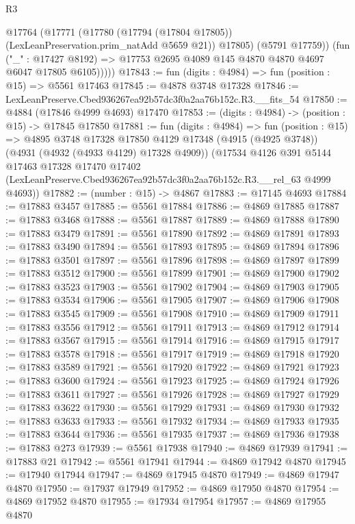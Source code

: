 \begin{lexlean}{R3}
\begin{coremodule}
            @17764
              (@17771
                (@17780 (@17794 (@17804 @17805)) (LexLeanPreservation.prim_natAdd @5659 @21))
                @17805)
              (@5791 @17759))
            (fun ("_" : @17427 @8192) =>
            @17753 @2695 @4089 @145 @4870 @4870 @4697 @6047 @17805 @6105)))))
@17843 := fun (digits : @4984) => fun (position : @15) => @5561 @17463
@17845 := @4878 @3748 @17328
@17846 := LexLeanPreserve.Cbed936267ea92b57dc3f0a2aa76b152c.R3.__fits_54
@17850 := @4884 (@17846 @4999 @4693) @17470
@17853 := (digits : @4984) -> (position : @15) -> @17845 @17850
@17881 := fun (digits : @4984) =>
  fun (position : @15) =>
  @4895
    @3748
    @17328
    @17850
    @4129
    @17348
    (@4915 (@4925 @3748))
    (@4931 (@4932 (@4933 @4129) @17328 @4909))
    (@17534
      @4126
      @391
      @5144
      @17463
      @17328
      @17470
      @17402
      (LexLeanPreserve.Cbed936267ea92b57dc3f0a2aa76b152c.R3.__rel_63 @4999 @4693))
@17882 := (number : @15) -> @4867
@17883 := @17145 @4693
@17884 := @17883 @3457
@17885 := @5561 @17884
@17886 := @4869 @17885
@17887 := @17883 @3468
@17888 := @5561 @17887
@17889 := @4869 @17888
@17890 := @17883 @3479
@17891 := @5561 @17890
@17892 := @4869 @17891
@17893 := @17883 @3490
@17894 := @5561 @17893
@17895 := @4869 @17894
@17896 := @17883 @3501
@17897 := @5561 @17896
@17898 := @4869 @17897
@17899 := @17883 @3512
@17900 := @5561 @17899
@17901 := @4869 @17900
@17902 := @17883 @3523
@17903 := @5561 @17902
@17904 := @4869 @17903
@17905 := @17883 @3534
@17906 := @5561 @17905
@17907 := @4869 @17906
@17908 := @17883 @3545
@17909 := @5561 @17908
@17910 := @4869 @17909
@17911 := @17883 @3556
@17912 := @5561 @17911
@17913 := @4869 @17912
@17914 := @17883 @3567
@17915 := @5561 @17914
@17916 := @4869 @17915
@17917 := @17883 @3578
@17918 := @5561 @17917
@17919 := @4869 @17918
@17920 := @17883 @3589
@17921 := @5561 @17920
@17922 := @4869 @17921
@17923 := @17883 @3600
@17924 := @5561 @17923
@17925 := @4869 @17924
@17926 := @17883 @3611
@17927 := @5561 @17926
@17928 := @4869 @17927
@17929 := @17883 @3622
@17930 := @5561 @17929
@17931 := @4869 @17930
@17932 := @17883 @3633
@17933 := @5561 @17932
@17934 := @4869 @17933
@17935 := @17883 @3644
@17936 := @5561 @17935
@17937 := @4869 @17936
@17938 := @17883 @273
@17939 := @5561 @17938
@17940 := @4869 @17939
@17941 := @17883 @21
@17942 := @5561 @17941
@17944 := @4869 @17942 @4870
@17945 := @17940 @17944
@17947 := @4869 @17945 @4870
@17949 := @4869 @17947 @4870
@17950 := @17937 @17949
@17952 := @4869 @17950 @4870
@17954 := @4869 @17952 @4870
@17955 := @17934 @17954
@17957 := @4869 @17955 @4870

\end{coremodule}
\end{lexlean}
